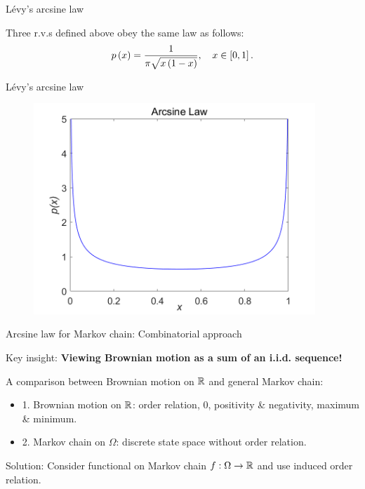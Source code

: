 \documentclass{beamer}
\begin{document}
\begin{frame}{L\'{e}vy's arcsine law}
\par
\begin{Thm}\label{levy}
    Three r.v.s defined above obey the same law as follows:
    \begin{equation}
        p\left( x \right) = \frac{1}{\pi\sqrt{x\left( 1 - x \right)}}, \quad x \in \left[ 0, 1 \right].
    \end{equation}
\end{Thm}
\end{frame}


\begin{frame}{L\'{e}vy's arcsine law}
\par
\begin{figure}[H]
	\centering
  	\includegraphics[width=10.6cm]{arcsine law.png}
\end{figure}
\end{frame}


\begin{frame}{Arcsine law for Markov chain: Combinatorial approach}
\par
Key insight: \textbf{Viewing Brownian motion as a sum of an i.i.d. sequence!}
\par
A comparison between Brownian motion on $\mathbb{R}$ and general Markov chain:
\begin{itemize}
    \item 1. Brownian motion on $\mathbb{R}$: order relation, $0$, positivity \& negativity, maximum \& minimum.     \\
    \item 2. Markov chain on $\Omega$: discrete state space without order relation.     \\
\end{itemize}
\par
Solution: Consider functional on Markov chain $f: \Omega \rightarrow \mathbb{R}$ and use induced order relation.
\end{frame}
\end{document}
